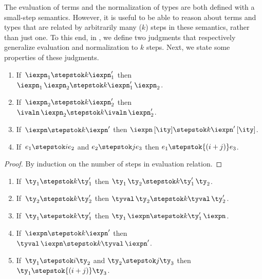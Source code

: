 The evaluation of \fomega{} terms and the normalization of \ddc{}
types are both defined with a small-step semantics. However, it is
useful to be able to reason about terms and types that are related by
arbitrarily many ($k$) steps in these semantics, rather than just one.
To this end, in , we define two
judgments that respectively generalize evaluation and normalization to
$k$ steps. Next, we state some properties of these judgments.

\begin{lemma}
  \begin{enumerate}
  \item If $\,\iexpn_1 \stepstok k \iexpn_1'$ then $\iexpn_1 \, \iexpn_2
    \stepstok k \iexpn_1' \, \iexpn_2$.
  \item If $\,\iexpn_2 \stepstok k \iexpn_2'$ then $\ivaln \, \iexpn_2
    \stepstok k \ivaln \, \iexpn_2'$.
  \item If $\,\iexpn \stepstok k \iexpn'$ then $\iexpn \, [\ity]
    \stepstok k \iexpn' \, [\ity]$.
  \item If $\, e_1 \stepstok i e_2$ and $e_2 \stepstok j e_3$
    then $e_1 \stepstok {(i+j)} e_3$.
  \end{enumerate}
\label{lemma:kleene-eval}
\end{lemma}

\begin{proof}
  By induction on the number of steps in evaluation relation.
\end{proof}

\begin{lemma}
  \begin{enumerate}
  \item If $\,\ty_1 \stepstok k \ty_1'$ then $\ty_1 \, \ty_2
    \stepstok k \ty_1' \, \ty_2$.
  \item If $\,\ty_2 \stepstok k \ty_2'$ then $\tyval \, \ty_2
    \stepstok k \tyval \, \ty_2'$.
  \item If $\,\ty_1 \stepstok k \ty_1'$ then $\ty_1 \, \iexpn
    \stepstok k \ty_1' \, \iexpn$.
  \item If $\,\iexpn \stepstok k \iexpn'$ then $\tyval \, \iexpn
    \stepstok k \tyval \, \iexpn'$.
  \item If $\,\ty_1 \stepstok i \ty_2$ and $\ty_2 \stepstok j \ty_3$
    then $\ty_1 \stepstok {(i+j)} \ty_3$.
  \end{enumerate}
\label{lemma:kleene-norm}
\end{lemma}

